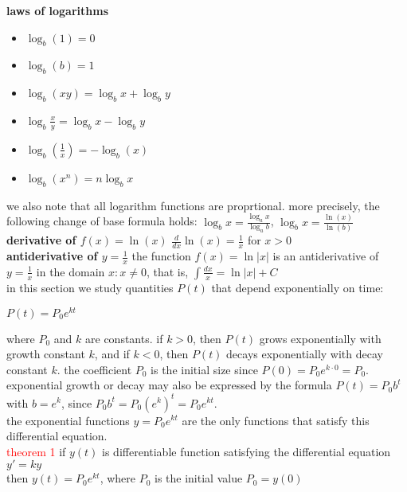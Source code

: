 \documentclass{article}
\begin{document}
\textbf{laws of logarithms}
	\begin{itemize}
		\item $\log_{b}(1) = 0$
		\item $\log_{b}(b) = 1$
		\item $\log_{b}(xy) = \log_{b}x + \log_{b}y$
		\item $\log_{b}\frac{x}{y} = \log_{b}x - \log_{b}y$
		\item $\log_{b}(\frac{1}{x}) = -\log_{b}(x)$
		\item $\log_{b}(x^n) = n\log_{b}x$
	\end{itemize}
we also note that all logarithm functions are proprtional. more precisely, the following change of base formula holds: $\log_{b}x = \frac{\log_{a}x}{\log_{a}b}$, $\log_{b}x = \frac{\ln(x)}{\ln(b)}$\\

\textbf{derivative of $f(x) = \ln(x)$} $\frac{d}{dx}\ln(x) = \frac{1}{x}$ for $x > 0$\\

\textbf{antiderivative of $y = \frac{1}{x}$} the function $f(x) = \ln \lvert x\rvert$ is an antiderivative of $y = \frac{1}{x}$ in the domain ${x : x \neq 0}$, that is, $\int\frac{dx}{x} = \ln \lvert x \rvert + C$\\

in this section we study quantities $P(t)$ that depend exponentially on time:

\begin{center}$P(t) = P_0e^{kt}$\end{center}

where $P_0$ and $k$ are constants. if $k > 0$, then $P(t)$ grows exponentially with growth constant $k$, and if $k < 0$, then $P(t)$ decays exponentially with decay constant $k$. the coefficient $P_0$ is the initial size since $P(0) = P_0e^{k \cdot 0} = P_0$. exponential growth or decay may also be expressed by the formula $P(t) = P_0b^t$ with $b = e^k$, since $P_0b^t = P_0(e^k)^t = P_0e^{kt}$.\\

the exponential functions $y = P_0e^{kt}$ are the only functions that satisfy this differential equation.\\
\textcolor{red}{theorem 1} if $y(t)$ is differentiable function satisfying the differential equation\\
$y' = ky$\\
then $y(t) = P_0e^{kt}$, where $P_0$ is the initial value $P_0 = y(0)$\\
\end{document}
